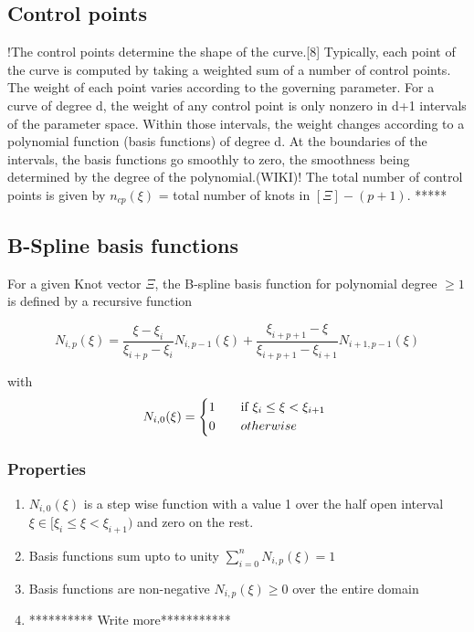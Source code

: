 \documentclass[12pt]{article}
\begin{document}
\subsection{Control points }
!The control points determine the shape of the curve.[8] Typically, each point of the curve is computed by taking a weighted sum of a number of control points. The weight of each point varies according to the governing parameter. For a curve of degree d, the weight of any control point is only nonzero in d+1 intervals of the parameter space. Within those intervals, the weight changes according to a polynomial function (basis functions) of degree d. At the boundaries of the intervals, the basis functions go smoothly to zero, the smoothness being determined by the degree of the polynomial.(WIKI)! The total number of control points is given by $n_{cp}(\xi)$ = total number of knots in $[\Xi] - (p+1)$. *****



\subsection{B-Spline basis functions }

For a given Knot vector $\Xi$, the B-spline basis function for polynomial degree $\geq 1$ is defined by a recursive function

\begin{equation}
N_{i,p}(\xi) = \frac{\xi-\xi_{i}}{\xi_{i+p}-\xi_{i}} N_{i,p-1}(\xi) + 
\frac{\xi_{i+p+1}-\xi}{\xi_{i+p+1}-\xi_{i+1}} N_{i+1,p-1}(\xi)
\end{equation}

\noindent
with
\begin{equation}
 N_{i,0}(\xi) = 
\begin{cases*}
1 \quad& if $  \xi_{i} \leq \xi<\xi_{i+1} $ \\
0 &  $ otherwise $ \\
\end{cases*}
\end{equation}

\subsubsection{Properties }
\begin{enumerate}
\item $ N_{i,0}(\xi)$ is a step wise function with a value 1 over the half open interval $ \xi \in [\xi_{i}  \leq \xi<\xi_{i+1}) $ and zero on the rest.
\item Basis functions sum upto to unity $\sum_{i=0}^{n} N_{i,p}(\xi) =1$
\item Basis functions are non-negative $ N_{i,p}(\xi) \geq 0$ over the entire
 domain
\item********** Write more*********** 
\end{enumerate}
\end{document}
